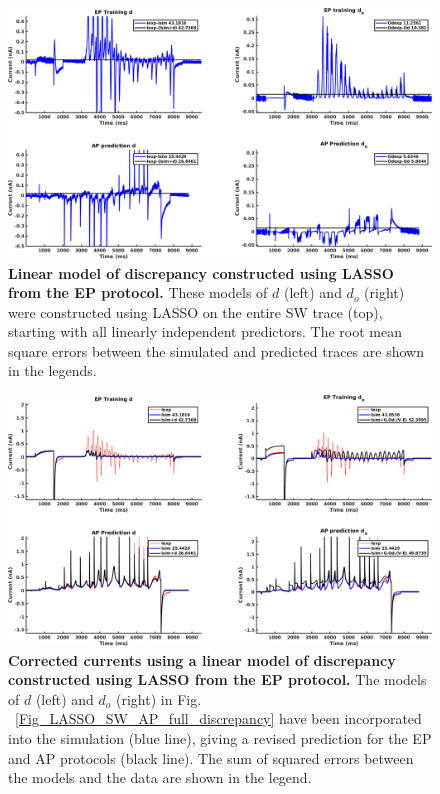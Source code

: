 \documentclass[11pt,a4paper,oneside]{article}
\begin{document}
\clearpage

\begin{figure}[t]
\begin{center}
\includegraphics[scale=0.42]{Figures/LASSO_EP_AP_full_discrepancy.png}
\caption{\textbf{Linear model of discrepancy constructed using LASSO from the EP protocol.} These models of $d$ (left) and $d_o$ (right) were constructed using LASSO on the entire SW trace (top), starting with all linearly independent predictors. The root mean square errors between the simulated and predicted traces are shown in the legends. } 
\label{Fig_LASSO_EP_AP_full_discrepancy}
\end{center}
\end{figure}

\begin{figure}[hb]
\begin{center}
\includegraphics[scale=0.42]{Figures/LASSO_EP_AP_full_currents.png}
\caption{\textbf{Corrected currents using a linear model of discrepancy constructed using LASSO from the EP protocol.} The models of $d$ (left) and $d_o$ (right) in Fig. ~\ref{Fig_LASSO_SW_AP_full_discrepancy} have been incorporated into the simulation (blue line), giving a revised prediction for the EP and AP protocols (black line). The sum of squared errors between the models and the data are shown in the legend.}
\label{Fig_LASSO_EP_AP_full_currents}
\end{center}
\end{figure}
\end{document}
